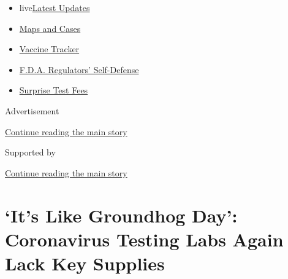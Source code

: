 \begin{itemize}
\tightlist
\item
  live\href{https://www.nytimes3xbfgragh.onion/2020/09/11/world/covid-19-coronavirus.html?name=styln-coronavirus-national\&region=TOP_BANNER\&block=storyline_menu_recirc\&action=click\&pgtype=Article\&impression_id=58f1aeb0-f4c5-11ea-9f76-ef806bade584\&variant=undefined}{Latest
  Updates}
\item
  \href{https://www.nytimes3xbfgragh.onion/interactive/2020/us/coronavirus-us-cases.html?name=styln-coronavirus-national\&region=TOP_BANNER\&block=storyline_menu_recirc\&action=click\&pgtype=Article\&impression_id=58f1aeb1-f4c5-11ea-9f76-ef806bade584\&variant=undefined}{Maps
  and Cases}
\item
  \href{https://www.nytimes3xbfgragh.onion/interactive/2020/science/coronavirus-vaccine-tracker.html?name=styln-coronavirus-national\&region=TOP_BANNER\&block=storyline_menu_recirc\&action=click\&pgtype=Article\&impression_id=58f1aeb2-f4c5-11ea-9f76-ef806bade584\&variant=undefined}{Vaccine
  Tracker}
\item
  \href{https://www.nytimes3xbfgragh.onion/2020/09/10/us/politics/fda-coronavirus-vaccine.html?name=styln-coronavirus-national\&region=TOP_BANNER\&block=storyline_menu_recirc\&action=click\&pgtype=Article\&impression_id=58f1aeb3-f4c5-11ea-9f76-ef806bade584\&variant=undefined}{F.D.A.
  Regulators' Self-Defense}
\item
  \href{https://www.nytimes3xbfgragh.onion/2020/09/09/upshot/coronavirus-surprise-test-fees.html?name=styln-coronavirus-national\&region=TOP_BANNER\&block=storyline_menu_recirc\&action=click\&pgtype=Article\&impression_id=58f1d5c0-f4c5-11ea-9f76-ef806bade584\&variant=undefined}{Surprise
  Test Fees}
\end{itemize}

Advertisement

\protect\hyperlink{after-top}{Continue reading the main story}

Supported by

\protect\hyperlink{after-sponsor}{Continue reading the main story}

\hypertarget{its-like-groundhog-day-coronavirus-testing-labs-again-lack-key-supplies}{%
\section{`It's Like Groundhog Day': Coronavirus Testing Labs Again Lack
Key
Supplies}\label{its-like-groundhog-day-coronavirus-testing-labs-again-lack-key-supplies}}

